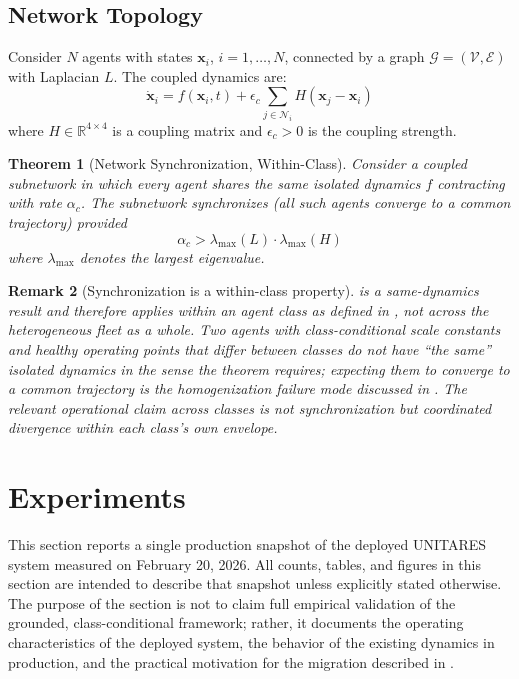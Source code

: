 \documentclass[11pt,twocolumn]{article}
\newtheorem{theorem}{Theorem}[section]
\newtheorem{remark}[theorem]{Remark}
\newcommand{\R}{\mathbb{R}}
\newcommand{\eisv}{\ensuremath{\mathbf{x}}}
\begin{document}
\subsection{Network Topology}

Consider $N$ agents with states $\eisv_i$, $i = 1, \ldots, N$,
connected by a graph $\mathcal{G} = (\mathcal{V}, \mathcal{E})$ with
Laplacian $L$. The coupled dynamics are:
\begin{equation}
  \dot{\eisv}_i = f(\eisv_i, t)
  + \epsilon_c \sum_{j \in \mathcal{N}_i} H(\eisv_j - \eisv_i)
  \label{eq:network}
\end{equation}
where $H \in \R^{4 \times 4}$ is a coupling matrix and
$\epsilon_c > 0$ is the coupling strength.

\begin{theorem}[Network Synchronization, Within-Class]
\label{thm:network}
Consider a coupled subnetwork in which every agent shares the same
isolated dynamics $f$ contracting with rate $\alpha_c$. The
subnetwork synchronizes (all such agents converge to a common
trajectory) provided
\begin{equation}
  \alpha_c > \lambda_{\max}(L) \cdot \lambda_{\max}(H)
  \label{eq:sync-condition}
\end{equation}
where $\lambda_{\max}$ denotes the largest eigenvalue.
\end{theorem}

\begin{remark}[Synchronization is a within-class property]
 is a same-dynamics result and therefore applies
within an agent class as defined in , not
across the heterogeneous fleet as a whole. Two agents with
class-conditional scale constants and healthy operating points that
differ between classes do not have ``the same'' isolated dynamics in
the sense the theorem requires; expecting them to converge to a
common trajectory is the homogenization failure mode discussed in
. The relevant operational claim across
classes is not synchronization but coordinated divergence within each
class's own envelope.
\end{remark}


\section{Experiments}
\label{sec:experiments}

This section reports a single production snapshot of the deployed
UNITARES system measured on February 20, 2026. All counts, tables, and
figures in this section are intended to describe that snapshot unless
explicitly stated otherwise. The purpose of the section is not to claim
full empirical validation of the grounded, class-conditional framework;
rather, it documents the operating characteristics of the deployed
system, the behavior of the existing dynamics in production, and the
practical motivation for the migration described in
.
\end{document}
